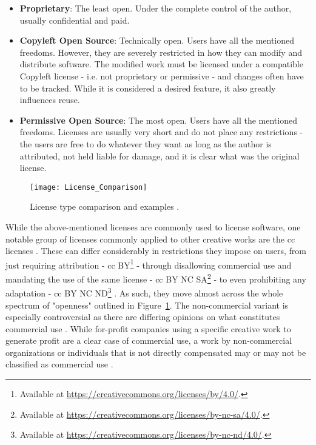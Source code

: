 \begin{itemize}
    \item \textbf{Proprietary}: The least open. Under the complete control of the author, usually confidential and paid.
    \item \textbf{Copyleft Open Source}: Technically open. Users have all the mentioned freedoms. However, they are severely restricted in how they can modify and distribute software. The modified work must be licensed under a compatible Copyleft license - i.e. not proprietary or permissive - and changes often have to be tracked. While it is considered a desired feature, it also greatly influences reuse.
    \item \textbf{Permissive Open Source}: The most open. Users have all the mentioned freedoms. Licenses are usually very short and do not place any restrictions - the users are free to do whatever they want as long as the author is attributed, not held liable for damage, and it is clear what was the original license.
\end{itemize}

\begin{figure}[H]
    \centering
    \texttt{[image: License\_Comparison]}
    \caption{License type comparison and examples \parencite{Duras_2020}.}
    \label{fig:license-comparison}
\end{figure}

While the above-mentioned licenses are commonly used to license software, one notable group of licenses commonly applied to other creative works are the \gls{cc} licenses \parencite{Hagedorn_2011}.
These can differ considerably in restrictions they impose on users, from just requiring attribution - \gls{cc} BY\footnote{Available at \url{https://creativecommons.org/licenses/by/4.0/}.} - through disallowing commercial use and mandating the use of the same license - \gls{cc} BY NC SA\footnote{Available at \url{https://creativecommons.org/licenses/by-nc-sa/4.0/}.} - to even prohibiting any adaptation - \gls{cc} BY NC ND\footnote{Available at \url{https://creativecommons.org/licenses/by-nc-nd/4.0/}.} \parencite{Hagedorn_2011}.
As such, they move almost across the whole spectrum of "openness" outlined in Figure~\ref{fig:license-comparison}.
The non-commercial variant is especially controversial as there are differing opinions on what constitutes commercial use \parencite{Hagedorn_2011}.
While for-profit companies using a specific creative work to generate profit are a clear case of commercial use, a work by non-commercial organizations or individuals that is not directly compensated may or may not be classified as commercial use \parencite{Hagedorn_2011}.

